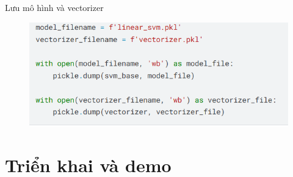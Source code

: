 \documentclass[serif, aspectratio=169]{beamer}
\begin{document}
	\begin{frame}{Lưu mô hình và vectorizer}
		\begin{figure}
			\centering
			\includegraphics[width=1\linewidth]{pic/save-model-vectorizer.png}
			\label{fig:save-model-vectorizer}
		\end{figure}
	\end{frame}
	
	
	
	\section{Triển khai và demo}
\end{document}
